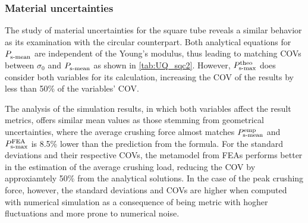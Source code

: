 \documentclass[12pt,number,preprint,review,times]{elsarticle}
\begin{document}
\subsubsection{Material uncertainties}

The study of material uncertainties for the square tube reveals a similar behavior as its examination with the circular counterpart. Both analytical equations for $P^{\mathrm{}}_{\mathrm{s{\text -}mean}}$ are independent of the Young's modulus, thus leading to matching COVs between $\sigma_0$ and $P^{\mathrm{}}_{\mathrm{s{\text -}mean}}$ as shown in \cref{tab:UQ_sqc2}. However, $P^{\mathrm{theo}}_{\mathrm{s{\text -}max}}$ does consider both variables for its calculation, increasing the COV of the results by less than 50\% of the variables' COV.

The analysis of the simulation results, in which both variables affect the result metrics, offers similar mean values as those stemming from geometrical uncertainties, where the average crushing force almost matches $P^{\mathrm{emp}}_{\mathrm{s{\text -}mean}}$ and $P^{\mathrm{FEA}}_{\mathrm{s{\text -}max}}$ is 8.5\% lower than the prediction from the formula. For the standard deviations and their respective COVs, the metamodel from FEAs performs better in the estimation of the average crushing load, reducing the COV by approxiamtely 50\% from the analytical solutions. In the case of the peak crushing force, however, the standard deviations and COVs are higher when computed with numerical simulation as a consequence of being metric with hogher fluctuations and more prone to numerical noise.

\end{document}

